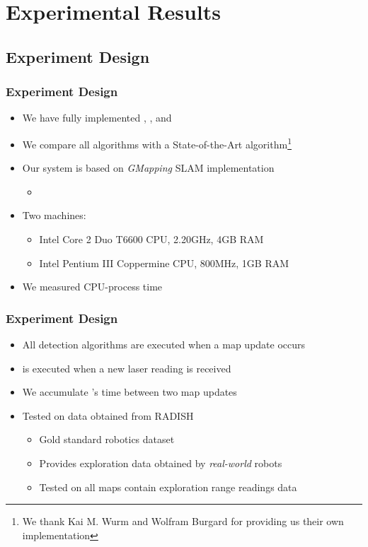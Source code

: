 \section{Experimental Results}

\subsection*{Experiment Design}
\begin{frame}
\frametitle{Experiment Design}
\begin{itemize}
  \item We have fully implemented \WFD, \WFDINC, \WFDIP and \FFD 
  \item We compare all algorithms with a State-of-the-Art algorithm\footnote{We
  thank Kai M. Wurm and Wolfram Burgard for providing us their own
  implementation}
  \item Our system is based on \emph{GMapping} SLAM implementation
  	\begin{itemize}
  		\item \citep{grisetti05icra,grisetti07tro} 
  	\end{itemize} 
  \item Two machines: 
  	\begin{itemize}
  		\item Intel Core 2 Duo T6600 CPU, 2.20GHz, 4GB RAM
  		\item Intel Pentium III Coppermine CPU, 800MHz, 1GB RAM %
  	\end{itemize} 
  \item We measured CPU-process time 
\end{itemize}
\end{frame}

\begin{frame}
\frametitle{Experiment Design}
\begin{itemize}
  \item All detection algorithms are executed when a map update occurs 
  \item \FFD is executed when a new laser reading is received 
  \item We accumulate \FFD's time between two map updates
  \item Tested on data obtained from RADISH \citep{Radish}
  	\begin{itemize}
  	  \item Gold standard robotics dataset
  	  \item Provides exploration data obtained by \emph{real-world} robots
  	  \item Tested on all maps contain exploration range readings data  
  	\end{itemize}  
\end{itemize}
\end{frame}


